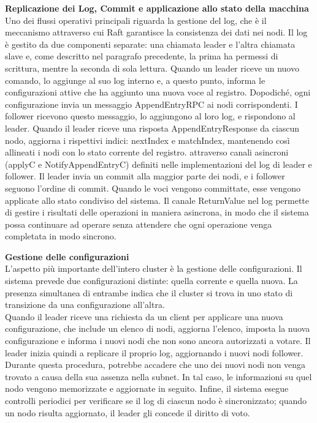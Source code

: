 \textbf{Replicazione dei Log, Commit e applicazione allo stato della macchina}\\
Uno dei flussi operativi principali riguarda la gestione del log, che è il meccanismo attraverso cui Raft garantisce la consistenza dei dati nei nodi. Il log è gestito da due componenti separate: una chiamata leader e l'altra 
chiamata slave e, come descritto nel paragrafo precedente, la prima ha permessi di scrittura, mentre la seconda di sola lettura.
Quando un leader riceve un nuovo comando, lo aggiunge al suo log interno e, a questo punto, informa le configurazioni attive che ha aggiunto una nuova voce al registro. Dopodiché, ogni configurazione invia un messaggio 
AppendEntryRPC ai nodi corrispondenti.
I follower ricevono questo messaggio, lo aggiungono al loro log, e rispondono al leader. 
Quando il leader riceve una risposta AppendEntryResponse da ciascun nodo, aggiorna i rispettivi indici: nextIndex e matchIndex, mantenendo così allineati i nodi con lo stato corrente del registro.
attraverso canali asincroni (applyC e NotifyAppendEntryC) definiti nelle implementazioni del log di leader e follower. Il leader invia un commit alla maggior parte dei nodi, e i follower seguono l'ordine di commit. 
Quando le voci vengono committate, esse vengono applicate allo stato condiviso del sistema.
Il canale ReturnValue nel log permette di gestire i risultati delle operazioni in maniera asincrona, in modo che il sistema possa continuare ad operare senza attendere che ogni operazione venga completata in modo sincrono.

\textbf{Gestione delle configurazioni}\\
L'aspetto più importante dell'intero cluster è la gestione delle configurazioni. Il sistema prevede due configurazioni distinte: quella corrente e quella nuova. La presenza simultanea di entrambe indica che il cluster si 
trova in uno stato di transizione da una configurazione all'altra.\\
Quando il leader riceve una richiesta da un client per applicare una nuova configurazione, che include un elenco di nodi, aggiorna l'elenco, imposta la nuova configurazione e informa i nuovi nodi che non sono ancora autorizzati
a votare. Il leader inizia quindi a replicare il proprio log, aggiornando i nuovi nodi follower.\\
Durante questa procedura, potrebbe accadere che uno dei nuovi nodi non venga trovato a causa della sua assenza nella subnet. In tal caso, le informazioni su quel nodo vengono memorizzate e aggiornate in seguito. Infine, 
il sistema esegue controlli periodici per verificare se il log di ciascun nodo è sincronizzato; quando un nodo risulta aggiornato, il leader gli concede il diritto di voto.

